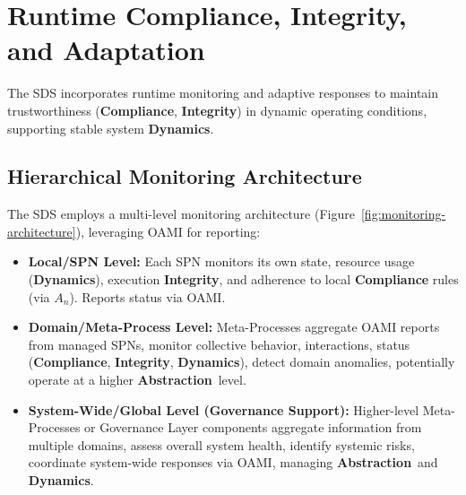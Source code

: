 \documentclass[12pt,a4paper]{report}
\newcommand{\Integrity}{\textbf{Integrity}}
\newcommand{\Abstraction}{\textbf{Abstraction}}
\newcommand{\Dynamics}{\textbf{Dynamics}}
\begin{document}
	\section{Runtime Compliance, Integrity, and Adaptation} %
	\label{sec:4-5} %
	
	The SDS incorporates runtime monitoring and adaptive responses to maintain trustworthiness (\textbf{Compliance}, \Integrity) in dynamic operating conditions, supporting stable system \Dynamics.
	
	\subsection{Hierarchical Monitoring Architecture} %
	\label{sec:4-5-1} %
	
	The SDS employs a multi-level monitoring architecture (Figure~\ref{fig:monitoring-architecture}), leveraging OAMI for reporting:
	\begin{itemize}[noitemsep]
		\item \textbf{Local/SPN Level:} Each SPN monitors its own state, resource usage (\Dynamics), execution \Integrity, and adherence to local \textbf{Compliance} rules (via $A_n$). Reports status via OAMI.
		\item \textbf{Domain/Meta-Process Level:} Meta-Processes aggregate OAMI reports from managed SPNs, monitor collective behavior, interactions, status (\textbf{Compliance}, \Integrity, \Dynamics), detect domain anomalies, potentially operate at a higher \Abstraction\ level.
		\item \textbf{System-Wide/Global Level (Governance Support):} Higher-level Meta-Processes or Governance Layer components aggregate information from multiple domains, assess overall system health, identify systemic risks, coordinate system-wide responses via OAMI, managing \Abstraction\ and \Dynamics.
	\end{itemize}
	
\end{document}
